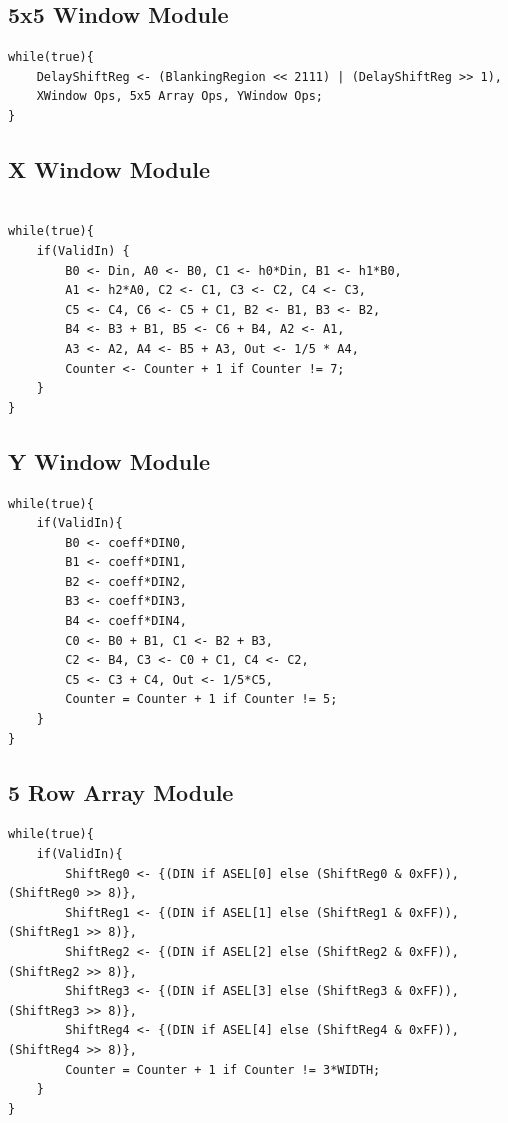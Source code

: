 \documentclass[11pt]{article}
\begin{document}
\subsection*{5x5 Window Module}
\begin{lstlisting}
while(true){
    DelayShiftReg <- (BlankingRegion << 2111) | (DelayShiftReg >> 1),
    XWindow Ops, 5x5 Array Ops, YWindow Ops;
}
\end{lstlisting}

\subsection*{X Window Module}
\begin{lstlisting}

while(true){
    if(ValidIn) {
        B0 <- Din, A0 <- B0, C1 <- h0*Din, B1 <- h1*B0, 
        A1 <- h2*A0, C2 <- C1, C3 <- C2, C4 <- C3, 
        C5 <- C4, C6 <- C5 + C1, B2 <- B1, B3 <- B2, 
        B4 <- B3 + B1, B5 <- C6 + B4, A2 <- A1, 
        A3 <- A2, A4 <- B5 + A3, Out <- 1/5 * A4, 
        Counter <- Counter + 1 if Counter != 7;
    }
}
\end{lstlisting}

\subsection*{Y Window Module}
\begin{lstlisting}
while(true){
    if(ValidIn){
        B0 <- coeff*DIN0, 
        B1 <- coeff*DIN1, 
        B2 <- coeff*DIN2, 
        B3 <- coeff*DIN3, 
        B4 <- coeff*DIN4, 
        C0 <- B0 + B1, C1 <- B2 + B3, 
        C2 <- B4, C3 <- C0 + C1, C4 <- C2, 
        C5 <- C3 + C4, Out <- 1/5*C5, 
        Counter = Counter + 1 if Counter != 5;
    }
}
\end{lstlisting}

\subsection*{5 Row Array Module}

\begin{lstlisting}
while(true){
    if(ValidIn){
        ShiftReg0 <- {(DIN if ASEL[0] else (ShiftReg0 & 0xFF)),  (ShiftReg0 >> 8)},
        ShiftReg1 <- {(DIN if ASEL[1] else (ShiftReg1 & 0xFF)),  (ShiftReg1 >> 8)},
        ShiftReg2 <- {(DIN if ASEL[2] else (ShiftReg2 & 0xFF)),  (ShiftReg2 >> 8)},
        ShiftReg3 <- {(DIN if ASEL[3] else (ShiftReg3 & 0xFF)),  (ShiftReg3 >> 8)},
        ShiftReg4 <- {(DIN if ASEL[4] else (ShiftReg4 & 0xFF)),  (ShiftReg4 >> 8)},
        Counter = Counter + 1 if Counter != 3*WIDTH;
    }
}
\end{lstlisting}
\end{document}
